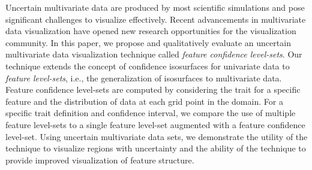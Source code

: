 Uncertain multivariate data are produced by most scientific simulations and pose significant challenges to visualize effectively.
%
Recent advancements in multivariate data visualization have opened new research opportunities for the visualization community.
%
In this paper, we propose and qualitatively evaluate an uncertain multivariate data visualization technique called \textit{feature confidence level-sets}.
%
Our technique extends the concept of confidence isosurfaces for univariate data to \textit{feature level-sets}, i.e., the generalization of isosurfaces to multivariate data.
%
Feature confidence level-sets are computed by considering the trait for a specific feature and the distribution of data at each grid point in the domain.
%
For a specific trait definition and confidence interval, we compare the use of multiple feature level-sets to a single feature level-set augmented with a feature confidence level-set.
%
Using uncertain multivariate data sets, we demonstrate the utility of the technique to visualize regions with uncertainty and the ability of the technique to provide improved visualization of feature structure. %
%
